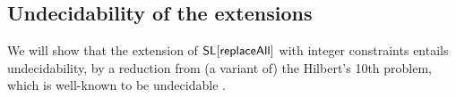 %	


%	
 


\subsection{Undecidability of the extensions}

We will show that the extension of $\mathsf{SL}[\mathsf{replaceAll}]$ with integer constraints entails undecidability, by a reduction from (a variant of) the Hilbert's 10th problem, which is well-known to be undecidable \cite{Mat93}. 



